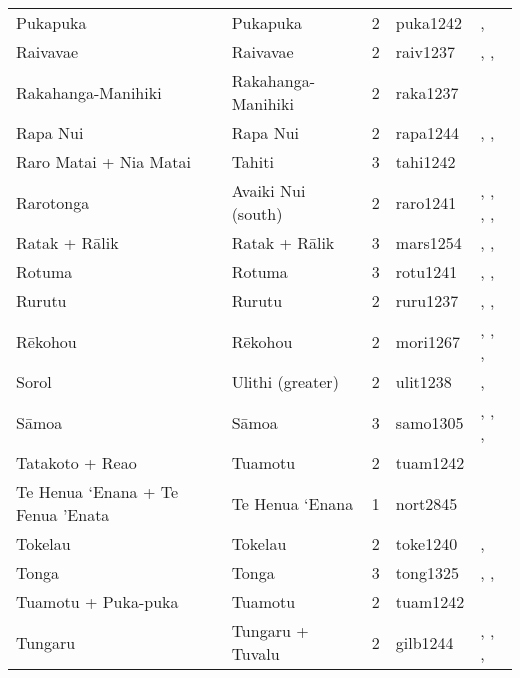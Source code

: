 \begin{longtable}{p{4.5cm}p{2cm}p{2cm}p{4cm}p{4cm}}
  Pukapuka & Pukapuka & 2 & puka1242 & \citet{beagleholeandbeaglehole1938}, \citet{macgregor1935} \\ 
  Raivavae & Raivavae & 2 & raiv1237 & \citet{aitken1930ethnology}, \citet{bollt2008excavations}, \citet{edwards2003archaeological} \\ 
  Rakahanga-Manihiki & Rakahanga-Manihiki & 2 & raka1237 & \citet{buck1932a} \\ 
  Rapa Nui & Rapa Nui & 2 & rapa1244 & \citet{sahlins1958social}, \citet{kirch1984evolution}, \citet{metraux_1971} \\ 
  Raro Matai + Nia Matai & Tahiti & 3 & tahi1242 & \citet{oliver2019ancient} \\ 
  Rarotonga & Avaiki Nui (south) & 2 & raro1241 & \citet{bellwood1971varieties}, \citet{buck1934}, \citet{crocombe_1967}, \citet{hayes1981cook}, \citet{walter1996} \\ 
  Ratak + Rālik & Ratak + Rālik & 3 & mars1254 & \citet{carruci1991marshall}, \citet{erdland1914}, \citet{williamson_1982} \\ 
  Rotuma & Rotuma & 3 & rotu1241 & \citet{gardiner1898natives}, \citet{howard1963conservatism}, \citet{howard1991} \\ 
  Rurutu & Rurutu & 2 & ruru1237 & \citet{aitken1930ethnology}, \citet{bollt2008excavations}, \citet{edwards2003archaeological} \\ 
  Rēkohou & Rēkohou & 2 & mori1267 & \citet{sahlins1958social}, \citet{buck1952}, \citet{kirch1984evolution}, \citet{van1995maori} \\ 
  Sorol & Ulithi (greater) & 2 & ulit1238 & \citet{lessa1950}, \citet{lessa1966} \\ 
  Sāmoa & Sāmoa & 3 & samo1305 & \citet{sahlins1958social}, \citet{buck1930}, \citet{keesing1934}, \citet{watters_1958} \\ 
  Tatakoto + Reao & Tuamotu & 2 & tuam1242 & \citet{emory1975material} \\ 
  Te Henua ‘Enana + Te Fenua ’Enata & Te Henua ‘Enana & 1 & nort2845 & \citet{sahlins1958social} \\ 
  Tokelau & Tokelau & 2 & toke1240 & \citet{hooper1973demographic}, \citet{macgregor1937} \\ 
  Tonga & Tonga & 3 & tong1325 & \citet{kirch1984evolution}, \citet{cummins1977tongan}, \citet{ferdon1988early} \\ 
  Tuamotu + Puka-puka & Tuamotu & 2 & tuam1242 & \citet{emory1975material} \\ 
  Tungaru & Tungaru + Tuvalu & 2 & gilb1244 & \citet{lambert1966}, \citet{lambert1975makin}, \citet{lambert1991}, \citet{macdonald1982cinderellas} \\ 

\end{longtable}
